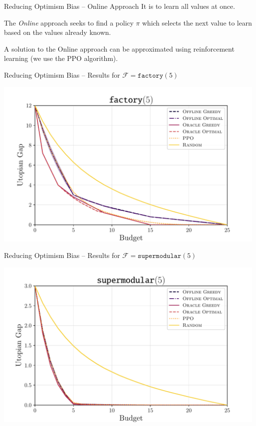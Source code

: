 \documentclass[aspectratio=169]{beamer}
\begin{document}
\begin{frame}{Reducing Optimism Bias -- Online Approach}
	It is  to learn all values at once.

	The \emph{Online} approach seeks to find a policy $ \pi $ which selects the next value to learn based on the values already known.

	A solution to the Online approach can be approximated using reinforcement learning (we use the PPO algorithm).
\end{frame}

\begin{frame}{Reducing Optimism Bias -- Results for $ \mathcal{F} = \texttt{factory} (5) $}
	\begin{center}
		\includegraphics[width=.8\textwidth]{figures/factory5.pdf}
	\end{center}
\end{frame}

\begin{frame}{Reducing Optimism Bias -- Results for $ \mathcal{F} = \texttt{supermodular} (5) $}
	\begin{center}
		\includegraphics[width=.8\textwidth]{figures/convex5.pdf}
	\end{center}
\end{frame}
\end{document}
